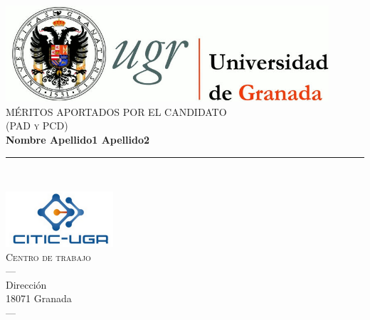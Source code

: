 \begin{titlepage}
 
 
\newlength{\centeroffset}
\setlength{\centeroffset}{-0.5\oddsidemargin}
\addtolength{\centeroffset}{0.5\evensidemargin}
\thispagestyle{empty}

\noindent\hspace*{\centeroffset}\begin{minipage}{\textwidth}

\centering
\includegraphics[width=0.9\textwidth]{imagenes/logo_ugr.jpg}\\[1.4cm]

\textsc{ \Large MÉRITOS APORTADOS POR EL CANDIDATO\\[0.2cm]}
\textsc{(PAD y PCD)}\\[0.5cm]
% 
{\Huge\bfseries Nombre Apellido1 Apellido2\\
}
\noindent\rule[-1ex]{\textwidth}{2pt}\\[1ex]

\end{minipage}

\vspace{2cm}
\noindent\hspace*{\centeroffset}\begin{minipage}{\textwidth}
\centering

\includegraphics[width=0.3\textwidth]{imagenes/citic.png}\\[0.1cm]
\textsc{Centro de trabajo}\\
\textsc{---}\\
Dirección\\
18071 Granada\\
\textsc{---}\\
\end{minipage}
\end{titlepage}


